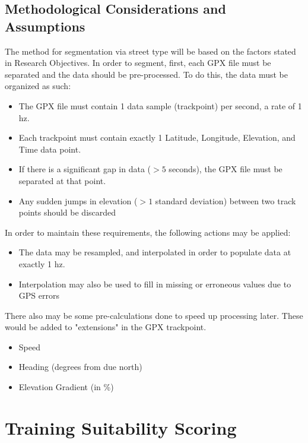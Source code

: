 \documentclass[12pt,a4paper]{report}
\begin{document}
\subsection{Methodological Considerations and Assumptions}
The method for segmentation via street type will be based on the factors stated in Research Objectives. In order to segment, first, each GPX file
must be separated and the data should be pre-processed. To do this, the data must be organized as such:
\begin{itemize}
	\item The GPX file must contain 1 data sample (trackpoint) per second, a rate of 1 hz.
	\item Each trackpoint must contain exactly 1 Latitude, Longitude, Elevation, and Time data point.
	\item If there is a significant gap in data ($>{}5$ seconds), the GPX file must be separated at that point.
	\item Any sudden jumps in elevation ($>{}1$ standard deviation) between two track points should be discarded
\end{itemize}
In order to maintain these requirements, the following actions may be applied:
\begin{itemize}
	\item The data may be resampled, and interpolated in order to populate data at exactly 1 hz.
	\item Interpolation may also be used to fill in missing or erroneous values due to GPS errors
\end{itemize}
There also may be some pre-calculations done to speed up processing later. These would be added to "extensions" in the GPX trackpoint.
\begin{itemize}
	\item Speed
	\item Heading (degrees from due north)
	\item Elevation Gradient (in \%)
\end{itemize}
\newpage

\section{Training Suitability Scoring}
\end{document}
